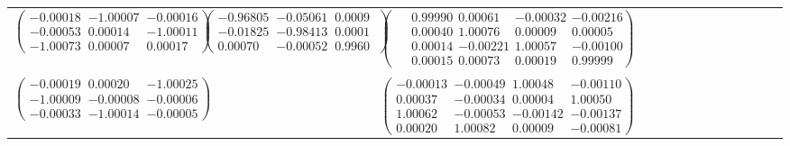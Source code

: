 \begin{table}
\begin{tabular*}{\textwidth}{@{}l*{15}{@{}l}}
  \\
  $\left(\begin{array}{ccc}
    -0.00018 & -1.00007 & -0.00016 \\
    -0.00053 &  0.00014 & -1.00011 \\
    -1.00073 &  0.00007 &  0.00017
  \end{array}\right)$&$\left(\begin{array}{ccc}
    -0.96805 & -0.05061 &  0.00096 \\
    -0.01825 & -0.98413 &  0.00012 \\
     0.00070 & -0.00052 &  0.99607
   \end{array}\right)$&$\left(\begin{array}{cccc}
    \phantom{-}0.99990 &  0.00061 & -0.00032 & -0.00216 \\
    \phantom{-}0.00040 &  1.00076 &  0.00009 &  0.00005 \\
    \phantom{-}0.00014 & -0.00221 &  1.00057 & -0.00100 \\
    \phantom{-}0.00015 &  0.00073 &  0.00019 &  0.99999
  \end{array}\right)$\\

  \\
  $\left(\begin{array}{ccc}
    -0.00019 &  0.00020 & -1.00025 \\
    -1.00009 & -0.00008 & -0.00006 \\
    -0.00033 & -1.00014 & -0.00005
  \end{array}\right)$&&$\left(\begin{array}{cccc}
    -0.00013 & -0.00049 &  1.00048 & -0.00110 \\
     0.00037 & -0.00034 &  0.00004 &  1.00050 \\
     1.00062 & -0.00053 & -0.00142 & -0.00137 \\
     0.00020 &  1.00082 &  0.00009 & -0.00081
   \end{array}\right)$\\
  

\end{tabular*}
\end{table}

